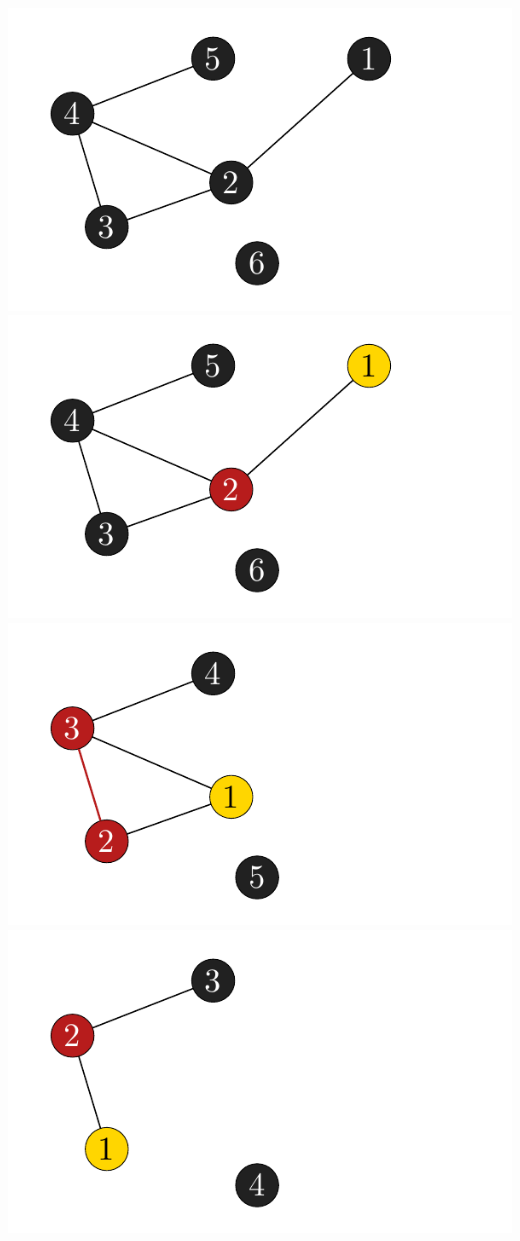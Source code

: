 \documentclass[xcolor=x11names,compress]{beamer}
\begin{document}
\begin{frame}
\begin{center}
\begin{overprint}
			\includegraphics[scale=1.0]{img/graph/peo/08.pdf}
			\onslide<9>\includegraphics[scale=1.0]{img/graph/peo/09.pdf}
			\onslide<10>\includegraphics[scale=1.0]{img/graph/peo/10.pdf}
			\onslide<11>\includegraphics[scale=1.0]{img/graph/peo/11.pdf}

\end{overprint}
\end{center}
\end{frame}
\end{document}
